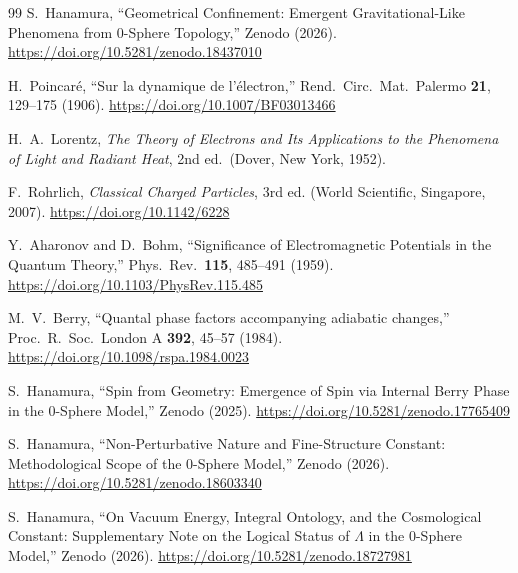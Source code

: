 \documentclass[12pt,a4paper]{article}
\begin{document}
\begin{thebibliography}{99}
S.~Hanamura,
``Geometrical Confinement: Emergent Gravitational-Like Phenomena from 0-Sphere Topology,''
Zenodo (2026).
\href{https://doi.org/10.5281/zenodo.18437010}{https://doi.org/10.5281/zenodo.18437010}

H.~Poincar\'e,
``Sur la dynamique de l'\'electron,''
Rend.\ Circ.\ Mat.\ Palermo \textbf{21}, 129--175 (1906).
\href{https://doi.org/10.1007/BF03013466}{https://doi.org/10.1007/BF03013466}

H.~A.~Lorentz,
\textit{The Theory of Electrons and Its Applications to the Phenomena of Light and Radiant Heat},
2nd ed.\ (Dover, New York, 1952).

F.~Rohrlich,
\textit{Classical Charged Particles}, 3rd ed.
(World Scientific, Singapore, 2007).
\href{https://doi.org/10.1142/6228}{https://doi.org/10.1142/6228}

Y.~Aharonov and D.~Bohm,
``Significance of Electromagnetic Potentials in the Quantum Theory,''
Phys.\ Rev.\ \textbf{115}, 485--491 (1959).
\href{https://doi.org/10.1103/PhysRev.115.485}{https://doi.org/10.1103/PhysRev.115.485}

M.~V.~Berry,
``Quantal phase factors accompanying adiabatic changes,''
Proc.\ R.\ Soc.\ London A \textbf{392}, 45--57 (1984).
\href{https://doi.org/10.1098/rspa.1984.0023}{https://doi.org/10.1098/rspa.1984.0023}

S.~Hanamura,
``Spin from Geometry: Emergence of Spin via Internal Berry Phase in the 0-Sphere Model,''
Zenodo (2025).
\href{https://doi.org/10.5281/zenodo.17765409}{https://doi.org/10.5281/zenodo.17765409}

S.~Hanamura,
``Non-Perturbative Nature and Fine-Structure Constant: Methodological Scope of the 0-Sphere Model,''
Zenodo (2026).
\href{https://doi.org/10.5281/zenodo.18603340}{https://doi.org/10.5281/zenodo.18603340}

S.~Hanamura,
``On Vacuum Energy, Integral Ontology, and the Cosmological Constant: Supplementary Note on the Logical Status of $\Lambda$ in the 0-Sphere Model,''
Zenodo (2026).
\href{https://doi.org/10.5281/zenodo.18727981}{https://doi.org/10.5281/zenodo.18727981}

\end{thebibliography}
\end{document}
